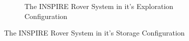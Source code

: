 \begin{figure}[htb]
\begin{subfigure}[b]{0.49\textwidth}
         \caption{The INSPIRE Rover System in it's Exploration Configuration}
         \label{fig:EndExplorationConfig}
     \end{subfigure}
     \caption{The INSPIRE Rover System in it's Storage Configuration}
     \label{fig:EndConfig}
\end{figure}

\clearpage